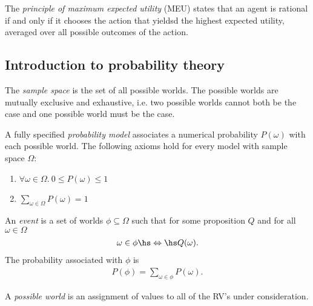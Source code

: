 \documentclass{article}
\begin{document}
\begin{definition}
	The \emph{principle of maximum expected utility} (MEU) states that an agent is rational
	if and only if it chooses the action that yieldsd the highest expected utility,
	averaged over all possible outcomes of the action.
\end{definition}

\subsection{Introduction to probability theory}

\renewcommand{\P}{\mathbf{P}}
\renewcommand{\vec}[1]{\mathbf{#1}}

\begin{definition}[R\&N p. 484]
	The \emph{sample space} is the set of all possible worlds.
	The possible worlds are mutually exclusive and exhaustive, i.e.
	two possible worlds cannot both be the case and one possible world must
	be the case.
\end{definition}

\begin{definition}
	A fully specified \emph{probability model} associates a numerical probability
	$P(\omega)$ with each possible world. The following axioms hold for every
	model with sample space $\Omega$:
	\begin{enumerate}[label=P\arabic*.]
		\item $\forall \omega\in\Omega.\:0\leq P(\omega)\leq 1$
		\item $\sum_{\omega\in\Omega} P(\omega)=1$
	\end{enumerate}
\end{definition}

\begin{definition}
	An \emph{event} is a set of worlds $\phi\subseteq \Omega$ such that
	for some proposition $Q$ and for all $\omega\in\Omega$
	\begin{align*}
		\omega\in \phi\hs\Leftrightarrow\hs Q(\omega).
	\end{align*}
	The probability associated with $\phi$ is
	\begin{align*}
		P(\phi)=\sum_{\omega\in\phi} P(\omega).
	\end{align*}
\end{definition}

\begin{definition}
	A \emph{possible world} is an assignment of values to all of the RV's
	under consideration.
\end{definition}
\end{document}

